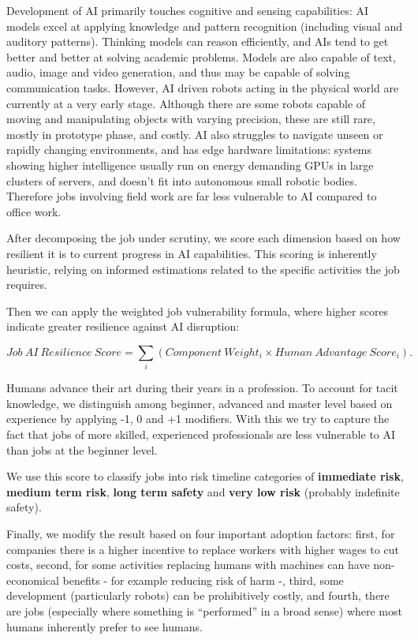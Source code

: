 \documentclass[
  11pt,
]{article}
\begin{document}
Development of AI primarily touches cognitive and sensing capabilities:
AI models excel at applying knowledge and pattern recognition (including
visual and auditory patterns). Thinking models can reason efficiently,
and AIs tend to get better and better at solving academic problems.
Models are also capable of text, audio, image and video generation, and
thus may be capable of solving communication tasks. However, AI driven
robots acting in the physical world are currently at a very early stage.
Although there are some robots capable of moving and manipulating
objects with varying precision, these are still rare, mostly in
prototype phase, and costly. AI also struggles to navigate unseen or
rapidly changing environments, and has edge hardware limitations:
systems showing higher intelligence usually run on energy demanding GPUs
in large clusters of servers, and doesn't fit into autonomous small
robotic bodies. Therefore jobs involving field work are far less
vulnerable to AI compared to office work.

After decomposing the job under scrutiny, we score each dimension based
on how resilient it is to current progress in AI capabilities. This
scoring is inherently heuristic, relying on informed estimations related
to the specific activities the job requires.

Then we can apply the weighted job vulnerability formula, where higher
scores indicate greater resilience against AI disruption:

\[Job\ AI\ Resilience\ Score = \sum_{i} (Component\ Weight_i \times Human\ Advantage\ Score_i).\]

\clearpage

Humans advance their art during their years in a profession. To account
for tacit knowledge, we distinguish among beginner, advanced and master
level based on experience by applying -1, 0 and +1 modifiers. With this
we try to capture the fact that jobs of more skilled, experienced
professionals are less vulnerable to AI than jobs at the beginner level.

We use this score to classify jobs into risk timeline categories of
\textbf{immediate risk}, \textbf{medium term risk}, \textbf{long term
safety} and \textbf{very low risk} (probably indefinite safety).

Finally, we modify the result based on four important adoption factors:
first, for companies there is a higher incentive to replace workers with
higher wages to cut costs, second, for some activities replacing humans
with machines can have non-economical benefits - for example reducing
risk of harm -, third, some development (particularly robots) can be
prohibitively costly, and fourth, there are jobs (especially where
something is ``performed'' in a broad sense) where most humans
inherently prefer to see humans.
\end{document}
